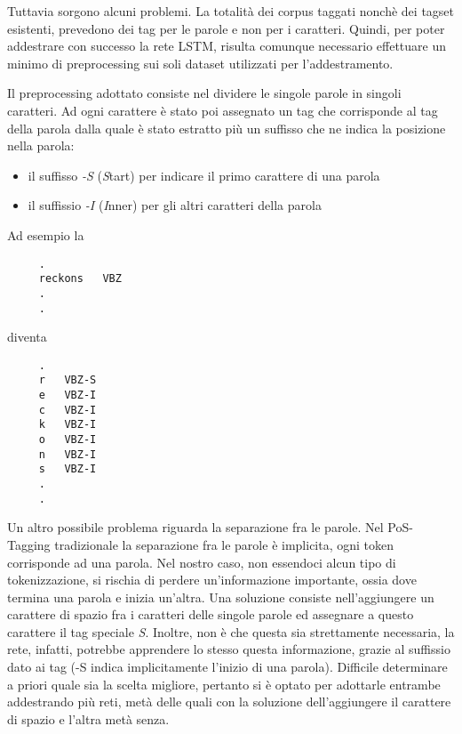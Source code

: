 Tuttavia sorgono alcuni problemi. La totalit\`a dei corpus taggati nonch\`e dei
tagset esistenti, prevedono dei tag per le parole e non per i caratteri. Quindi,
per poter addestrare con successo la rete LSTM, risulta comunque necessario
effettuare un minimo di preprocessing sui soli dataset utilizzati per l'addestramento.

Il preprocessing adottato consiste nel dividere le singole parole in singoli
caratteri. Ad ogni carattere \`e stato poi assegnato un tag che corrisponde al
tag della parola dalla quale \`e stato estratto pi\`u un suffisso che ne indica
la posizione nella parola:

\begin{itemize}
  \item il suffisso \emph{-S} (\emph{S}tart) per indicare il primo carattere di
        una parola
  \item il suffissio \emph{-I} (\emph{I}nner) per gli altri caratteri della parola
\end{itemize}

Ad esempio la

\begin{center}
  \begin{minipage}{5cm}
    \begin{verbatim}
     .
     reckons   VBZ
     .
     .
    \end{verbatim}
  \end{minipage}
\end{center}

diventa

\begin{center}
  \begin{minipage}{5cm}
    \begin{verbatim}
     .
     r   VBZ-S
     e   VBZ-I
     c   VBZ-I
     k   VBZ-I
     o   VBZ-I
     n   VBZ-I
     s   VBZ-I
     .
     .
    \end{verbatim}
  \end{minipage}
\end{center}

Un altro possibile problema riguarda la separazione fra le parole.
Nel PoS-Tagging tradizionale la separazione fra le parole \`e implicita, ogni
token corrisponde ad una parola. Nel nostro caso, non essendoci alcun tipo di
tokenizzazione, si rischia di perdere un'informazione importante, ossia dove
termina una parola e inizia un'altra. Una soluzione consiste nell'aggiungere un
carattere di spazio fra i caratteri delle singole parole ed assegnare a questo
carattere il tag speciale \emph{S}. Inoltre, non \`e che questa sia strettamente
necessaria, la rete, infatti, potrebbe apprendere lo stesso questa informazione,
grazie al suffissio dato ai tag (-S indica implicitamente l'inizio di una parola).
Difficile determinare a priori quale sia la scelta migliore, pertanto si \`e optato
per adottarle entrambe addestrando pi\`u reti, met\`a delle quali con la soluzione
dell'aggiungere il carattere di spazio e l'altra met\`a senza.

